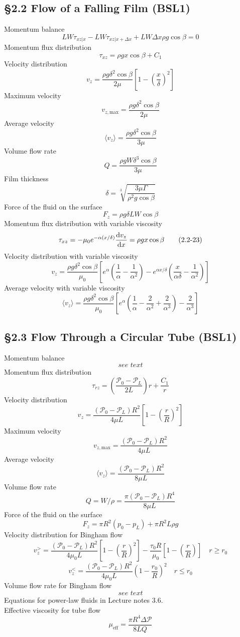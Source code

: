 \subsection{\S2.2 Flow of a Falling Film (BSL1)}
Momentum balance
\[
	LW\tau_{xz|x}-LW\tau_{xz|x+\Delta x}+LW\Delta x\rho g\cos\beta=0\tag{2.2-6}
\]
Momentum flux distribution%
\[
	\tau_{xz}=\rho gx\cos\beta+C_1\tag{2.2-9}
\]
Velocity distribution%
\[
	v_z=\frac{\rho g\delta^2\cos\beta}{2\mu}\left[1-\left(\frac{x}{\delta}\right)^2\right]\tag{2.2-16}
\]
Maximum velocity
\[
	v_{z,\text{max}}=\frac{\rho g\delta^2\cos\beta}{2\mu}\tag{2.2-17}
\]
Average velocity
\[
	\langle v_z\rangle=\frac{\rho g\delta^2\cos\beta}{3\mu}\tag{2.2-18}
\]
Volume flow rate
\[
	Q=\frac{\rho gW\delta^3\cos\beta}{3\mu}\tag{2.2-19}
\]
Film thickness
\[
	\delta=\sqrt[3]{\frac{3\mu\Gamma}{\rho^2 g\cos\beta}}\tag{2.2-20}
\]
Force of the fluid on the surface
\[
	F_z=\rho g\delta LW\cos\beta\tag{2.2-21}
\]
Momentum flux distribution with variable viscosity
\[
	\tau_{xz}=-\mu_0e^{-\alpha(x/\delta)}\frac{\mathop{}\!\mathrm{d} v_z}{\mathop{}\!\mathrm{d} x}=\rho gx\cos\beta\tag{2.2-23}
\]
Velocity distribution with variable viscosity
\[
	v_z=\frac{\rho g\delta^2\cos\beta}{\mu_0}\left[e^\alpha\left(\frac{1}{\alpha}-\frac{1}{\alpha^2}\right)-e^{\alpha x/\delta}\left(\frac{x}{\alpha\delta}-\frac{1}{\alpha^2}\right)\right]\tag{2.2-24}
\]
Average velocity with variable viscosity
\[
	\langle v_z\rangle=\frac{\rho g\delta^2\cos\beta}{\mu_0}\left[e^\alpha\left(\frac{1}{\alpha}-\frac{2}{\alpha^2}+\frac{2}{\alpha^3}\right)-\frac{2}{\alpha^3}\right]\tag{2.2-26}
\]
\subsection{\S2.3 Flow Through a Circular Tube (BSL1)}
Momentum balance
\[
	\textit{see text}\tag{2.3-8}
\]
Momentum flux distribution
\[
	\tau_{rz}=\left(\frac{\mathscr{P}_0-\mathscr{P}_L}{2L}\right)r+\frac{C_1}{r}\tag{2.3-11}
\]
Velocity distribution
\[
	v_z=\frac{(\mathscr{P}_0-\mathscr{P}_L)R^2}{4\mu L}\left[1-\left(\frac{r}{R}\right)^2\right]\tag{2.3-16}
\]
Maximum velocity
\[
	v_{z,\text{max}}=\frac{(\mathscr{P}_0-\mathscr{P}_L)R^2}{4\mu L}\tag{2.3-17}
\]
Average velocity
\[
	\langle v_z\rangle=\frac{(\mathscr{P}_0-\mathscr{P}_L)R^2}{8\mu L}\tag{2.3-18}
\]
Volume flow rate
\[
	Q=W/\rho=\frac{\pi(\mathscr{P}_0-\mathscr{P}_L)R^4}{8\mu L}\tag{2.3-19}
\]
Force of the fluid on the surface
\[
	F_z=\pi R^2(p_0-p_L)+\pi R^2L\rho g\tag{2.3-20}
\]
Velocity distribution for Bingham flow
\[
	v_z^>=\frac{(\mathscr{P}_0-\mathscr{P}_L)R^2}{4\mu_0 L}\left[1-\left(\frac{r}{R}\right)^2\right]-\frac{\tau_0 R}{\mu_0}\left[1-\left(\frac{r}{R}\right)\right] \quad r\geq r_0\tag{2.3-25}
\]
\[
	v_z^<=\frac{(\mathscr{P}_0-\mathscr{P}_L)R^2}{4\mu_0 L}\left(1-\frac{r_0}{R}\right)^2\quad r\leq r_0\tag{2.3-26}
\]
Volume flow rate for Bingham flow
\[
	\textit{see text}\tag{2.3-30}
\]
Equations for power-law fluids in Lecture notes 3.6.\\
Effective viscosity for tube flow
\[
	\mu_{\text{eff}}=\frac{\pi R^4\Delta\mathscr{P}}{8LQ}\tag{Lecture notes 3.8}
\]
